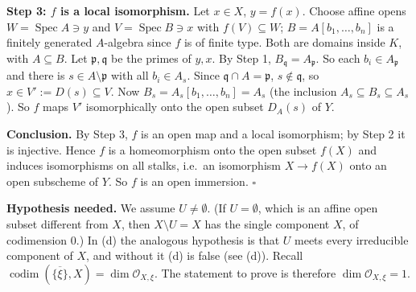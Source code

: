 \documentclass[11pt]{article}
\begin{document}
\textbf{Step 3: $f$ is a local isomorphism.} Let $x\in X$, $y=f(x)$. Choose affine opens $W=\operatorname{Spec}A\ni y$ and $V=\operatorname{Spec}B\ni x$ with $f(V)\subseteq W$; $B=A[b_1,\dots,b_n]$ is a finitely generated $A$-algebra since $f$ is of finite type. Both are domains inside $K$, with $A\subseteq B$. Let $\mathfrak p,\mathfrak q$ be the primes of $y,x$. By Step 1, $B_{\mathfrak q}=A_{\mathfrak p}$. So each $b_i\in A_{\mathfrak p}$ and there is $s\in A\setminus\mathfrak p$ with all $b_i\in A_s$. Since $\mathfrak q\cap A=\mathfrak p$, $s\notin\mathfrak q$, so $x\in V':=D(s)\subseteq V$. Now $B_s=A_s[b_1,\dots,b_n]=A_s$ (the inclusion $A_s\subseteq B_s\subseteq A_s$). So $f$ maps $V'$ isomorphically onto the open subset $D_A(s)$ of $Y$.

\textbf{Conclusion.} By Step 3, $f$ is an open map and a local isomorphism; by Step 2 it is injective. Hence $f$ is a homeomorphism onto the open subset $f(X)$ and induces isomorphisms on all stalks, i.e.\ an isomorphism $X\to f(X)$ onto an open subscheme of $Y$. So $f$ is an open immersion. \hfill$\square$

\pf
\textbf{Hypothesis needed.} We assume $U\ne\emptyset$. (If $U=\emptyset$, which is an affine open subset different from $X$, then $X\setminus U=X$ has the single component $X$, of codimension $0$.) In (d) the analogous hypothesis is that $U$ meets every irreducible component of $X$, and without it (d) is false (see (d)). Recall $\operatorname{codim}(\overline{\{\xi\}},X)=\dim\mathcal O_{X,\xi}$. The statement to prove is therefore $\dim\mathcal O_{X,\xi}=1$.
\end{document}
